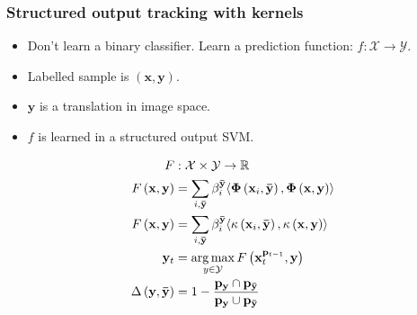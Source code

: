 \begin{frame}
    \frametitle{Structured output tracking with kernels \cite{6126251}}
    \begin{itemize}
        \item Don't learn a binary classifier. Learn a prediction function: \(f : \mathcal{X} \rightarrow \mathcal{Y}\).
        \item Labelled sample is \((\mathbf{x}, \mathbf{y})\).
        \item \(\mathbf{y}\) is a translation in image space.
        \item \(f\) is learned in a structured output SVM.
    \end{itemize}
    \begin{align}
        F &: \mathcal{X} \times \mathcal{Y} \rightarrow \mathbb{R} \\
        F\left(\mathbf{x}, \mathbf{y}\right) &= \sum_{i, \mathbf{\bar{y}}} \beta_i^\mathbf{\bar{y}}
            \langle \mathbf{\Phi}\left(\mathbf{x}_i, \mathbf{\bar{y}}\right),
            \mathbf{\Phi}\left(\mathbf{x}, \mathbf{y}\right) \rangle \\
        \label{eq:discriminant_function}
        F\left(\mathbf{x}, \mathbf{y}\right) &= \sum_{i, \mathbf{\bar{y}}} \beta_i^\mathbf{\bar{y}}
            \langle \kappa\left(\mathbf{x}_i, \mathbf{\bar{y}}\right),
            \kappa\left(\mathbf{x}, \mathbf{y}\right) \rangle \\
        \mathbf{y}_t &= \operatorname*{arg\,max}\limits_{y \in \mathcal{Y}} F \left(
            \mathbf{x}_t^{\mathbf{p}_{t-1}}, \mathbf{y} \right) \\
        \Delta \left( \mathbf{y}, \mathbf{\bar{y}} \right) &= 1 - \frac{\mathbf{p_y} \cap
            \mathbf{p_{\bar{y}}}}{\mathbf{p_y} \cup \mathbf{p_{\bar{y}}}}
    \end{align}
\end{frame}

